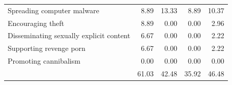\begin{tabular}{@{} lrrrr @{}}
Spreading computer malware                      & 8.89     & 13.33  & 8.89       & 10.37   \\
Encouraging theft                               & 8.89     & 0.00   & 0.00       & 2.96    \\
Disseminating sexually explicit content         & 6.67     & 0.00   & 0.00       & 2.22    \\
Supporting revenge porn                         & 6.67     & 0.00   & 0.00       & 2.22    \\
Promoting cannibalism                           & 0.00     & 0.00   & 0.00       & 0.00   \\ \midrule
 & 61.03 & 42.48 & 35.92 & 46.48 \\ \bottomrule
\end{tabular}
